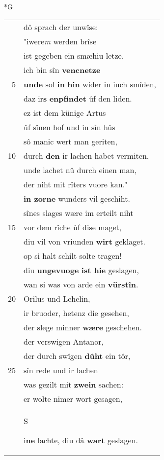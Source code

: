 \documentclass[8pt,a4paper,notitlepage]{article}
\begin{document}
\begin{table}[ht]
\begin{minipage}[t]{0.5\linewidth}
\small
\begin{center}*G
\end{center}
\begin{tabular}{rl}
 & dô sprach der unwîse:\\ 
 & "iwere\textit{m} werden brîse\\ 
 & ist gegeben ein smæhiu letze.\\ 
 & ich bin sîn \textbf{vencnetze}\\ 
5 & \textbf{unde} sol \textbf{in} \textbf{hin} wider in iuch smîden,\\ 
 & daz ir\textbf{s} \textbf{enpfindet} ûf den liden.\\ 
 & ez ist dem künige Artus\\ 
 & ûf sînen hof und in sîn hûs\\ 
 & sô manic wert man geriten,\\ 
10 & durch \textbf{den} ir lachen habet vermiten,\\ 
 & unde lachet nû durch einen man,\\ 
 & der niht mit rîters vuore kan."\\ 
 & \textbf{in zorne} wunders vil geschiht.\\ 
 & sînes slages wære im erteilt niht\\ 
15 & vor dem rîche ûf dise maget,\\ 
 & diu vil von vriunden \textbf{wirt} geklaget.\\ 
 & op si halt schilt solte tragen!\\ 
 & diu \textbf{ungevuoge} \textbf{ist hie} geslagen,\\ 
 & wan si was von arde ein \textbf{vürstîn}.\\ 
20 & Orilus und Lehelin,\\ 
 & ir bruoder, hetenz die gesehen,\\ 
 & der slege minner \textbf{wære} geschehen.\\ 
 & der verswigen Antanor,\\ 
 & der durch swîgen \textbf{dûht} ein tôr,\\ 
25 & sîn rede und ir lachen\\ 
 & was gezilt mit \textbf{zwein} sachen:\\ 
 & er wolte nimer wort gesagen,\\ 
 & \begin{large}S\end{large}i\textbf{ne} lachte, diu dâ \textbf{wart} geslagen.\\ 

\end{tabular}
\end{minipage}
\end{table}
\end{document}
